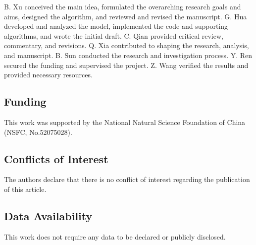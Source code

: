 \documentclass{article}
\begin{document}
B. Xu conceived the main idea, formulated the overarching research goals and aims, designed the algorithm, and reviewed and revised the manuscript.
G. Hua developed and analyzed the model, implemented the code and supporting algorithms, and wrote the initial draft.
C. Qian provided critical review, commentary, and revisions.
Q. Xia contributed to shaping the research, analysis, and manuscript.
B. Sun conducted the research and investigation process.
Y. Ren secured the funding and supervised the project.
Z. Wang verified the results and provided necessary resources.

\subsection*{Funding}

This work was supported by the National Natural Science Foundation of China (NSFC, No.52075028).

\subsection*{Conflicts of Interest}

The authors declare that there is no conflict of interest regarding the publication of this article.

\subsection*{Data Availability}

This work does not require any data to be declared or publicly disclosed.
\end{document}
